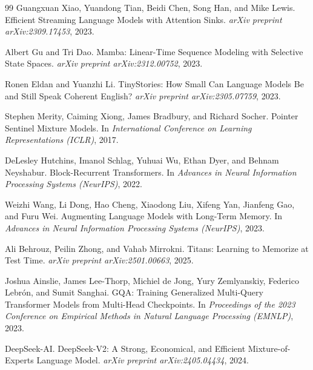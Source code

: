 \documentclass[10pt]{article} %
\begin{document}
\begin{thebibliography}{99}
Guangxuan Xiao, Yuandong Tian, Beidi Chen, Song Han, and Mike Lewis.
\newblock Efficient Streaming Language Models with Attention Sinks.
\newblock \emph{arXiv preprint arXiv:2309.17453}, 2023.

Albert Gu and Tri Dao.
\newblock Mamba: Linear-Time Sequence Modeling with Selective State Spaces.
\newblock \emph{arXiv preprint arXiv:2312.00752}, 2023.

Ronen Eldan and Yuanzhi Li.
\newblock TinyStories: How Small Can Language Models Be and Still Speak Coherent English?
\newblock \emph{arXiv preprint arXiv:2305.07759}, 2023.

Stephen Merity, Caiming Xiong, James Bradbury, and Richard Socher.
\newblock Pointer Sentinel Mixture Models.
\newblock In \emph{International Conference on Learning Representations (ICLR)}, 2017.

DeLesley Hutchins, Imanol Schlag, Yuhuai Wu, Ethan Dyer, and Behnam Neyshabur.
\newblock Block-Recurrent Transformers.
\newblock In \emph{Advances in Neural Information Processing Systems (NeurIPS)}, 2022.

Weizhi Wang, Li Dong, Hao Cheng, Xiaodong Liu, Xifeng Yan, Jianfeng Gao, and Furu Wei.
\newblock Augmenting Language Models with Long-Term Memory.
\newblock In \emph{Advances in Neural Information Processing Systems (NeurIPS)}, 2023.

Ali Behrouz, Peilin Zhong, and Vahab Mirrokni.
\newblock Titans: Learning to Memorize at Test Time.
\newblock \emph{arXiv preprint arXiv:2501.00663}, 2025.

Joshua Ainslie, James Lee-Thorp, Michiel de Jong, Yury Zemlyanskiy, Federico Lebrón, and Sumit Sanghai.
\newblock GQA: Training Generalized Multi-Query Transformer Models from Multi-Head Checkpoints.
\newblock In \emph{Proceedings of the 2023 Conference on Empirical Methods in Natural Language Processing (EMNLP)}, 2023.

DeepSeek-AI.
\newblock DeepSeek-V2: A Strong, Economical, and Efficient Mixture-of-Experts Language Model.
\newblock \emph{arXiv preprint arXiv:2405.04434}, 2024.


\end{thebibliography}
\end{document}
